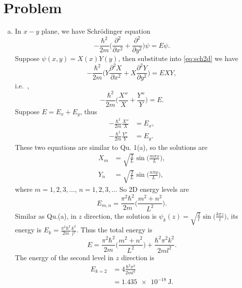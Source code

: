 \documentclass[12pt]{article}
\newcommand*{\RMN}[1]{\uppercase\expandafter{\romannumeral#1}}
\begin{document}
\section*{Problem \RMN{3}}

\begin{enumerate}[(a)]
	\item
	      In $x-y$ plane, we have Schr\"{o}dinger equation
	      \begin{equation}\label{eq:sch2d}
	      	- \frac{\hbar^2}{2m} \bigg( \frac{\partial^2}{\partial x^2}+\frac{\partial^2 }{\partial y^2} \bigg)\psi =E\psi.
	      \end{equation}
	      Suppose $\psi(x,y) = X(x)Y(y)$, then substitute into \eqref{eq:sch2d} we have
	      \begin{equation}
	      	- \frac{\hbar^2}{2m} \bigg( Y\frac{\partial^2X}{\partial x^2}+X\frac{\partial^2 Y}{\partial y^2} \bigg) =E X Y,
	      \end{equation}
	      i.e.\ ,
	      \begin{equation}
	      	- \frac{\hbar^2}{2m} \bigg( \frac{X''}{X}+\frac{Y''}{Y} \bigg) =E.
	      \end{equation}
	      Suppose $E= E_x + E_y$, thus
	      \begin{align}
	      	- \frac{\hbar^2}{2m}\frac{X''}{X} & = E_x , \\
	      	- \frac{\hbar^2}{2m}\frac{Y''}{Y} & = E_y.
	      \end{align}
	      These two equations are similar to Qu. 1(a), so the solutions are
	      \begin{align}
	      	X_m & = \sqrt{\frac{2}{L}} \sin \bigg( \frac{m \pi x}{L} \bigg), \\
	      	Y_n & = \sqrt{\frac{2}{L}} \sin \bigg( \frac{n \pi y}{L} \bigg),
	      \end{align}
	      where $m = 1, 2, 3, \ldots$, $n=1,2,3,\ldots$
	      So 2D energy levels are
	      \begin{equation}
	      	E_{m,n} = \frac{\pi^2\hbar^2}{2m} \bigg(\frac{m^2+n^2}{L^2}\bigg).
	      \end{equation}
	      Similar as Qu.(a), in $z$ direction, the solution is $\psi_k(z) =  \sqrt{\frac{2}{l}} \sin \big( \frac{k \pi z}{l} \big)$, its energy is $E_k =  \frac{\pi^2\hbar^2}{2m} \frac{k^2}{l^2}$.
	      Thus the total energy is
	      \begin{equation}
	      	E = \frac{\pi^2\hbar^2}{2m} \bigg(\frac{m^2+n^2}{L^2}\bigg) + \frac{\hbar^2\pi^2k^2}{2m l^2}.
	      \end{equation}
	      The energy of the second level in $z$ direction is
	      \begin{equation}
	      	\begin{split}
	      		E_{k=2}  &= 4 \frac{\hbar^2\pi^2}{2m l^2}\\
	      		&= \SI{1.435e-18}{\joule}.
	      	\end{split}
	      \end{equation}


\end{enumerate}
\end{document}
